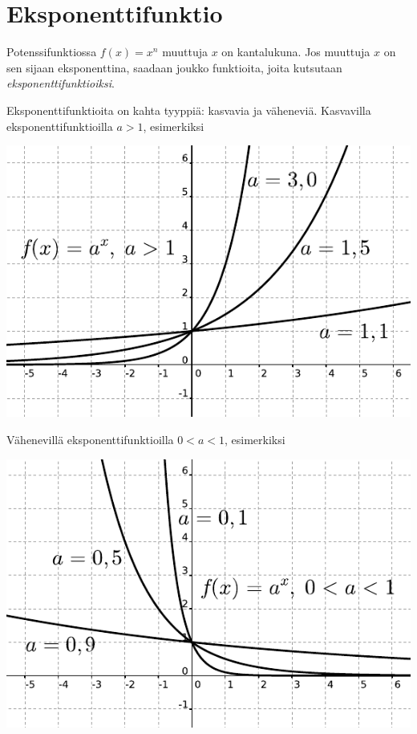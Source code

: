 \chapter{Eksponenttifunktio}

Potenssifunktiossa $f(x) = x^n$ muuttuja $x$ on kantalukuna. Jos muuttuja
$x$ on sen sijaan eksponenttina, saadaan joukko funktioita, joita
kutsutaan \emph{eksponenttifunktioiksi}.


Eksponenttifunktioita on kahta tyyppiä: kasvavia ja väheneviä.
Kasvavilla eksponenttifunktioilla $a>1$, esimerkiksi

\begin{center}
\includegraphics{pictures/apotenssiinxaisompikuinyksi.pdf}
\end{center}

Vähenevillä eksponenttifunktioilla $0<a<1$, esimerkiksi

\begin{center}
\includegraphics{pictures/apotenssiinxaisompikuinnolla.pdf}
\end{center}

